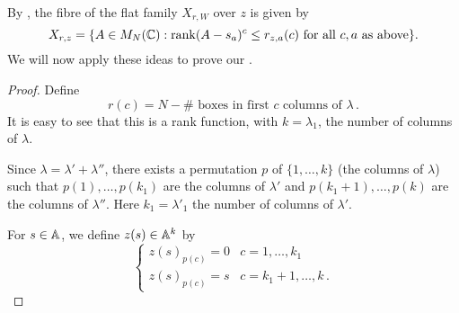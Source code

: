 \documentclass{article} %
\begin{document}
% 
By \cite[Corollary 2.2]{eisenbud1989rank}, the fibre of the flat family $ X_{r,W} $ over $ z$ is given by
\begin{equation} 
    \label{eq:ESfibre}
    X_{r,z} = \{ A \in M_N(\CC) :\rk (A-s_a)^c\le r_{z,a}(c) \text{ for all } c , a \text{ as above}\}.
\end{equation}
% 
We will now apply these ideas to prove our .
% 
\begin{proof}
% 
% 
Define 
$$
    r(c) = N - \#\text{~boxes in first $c$ columns of }\lambda\,.
$$
It is easy to see that this is a rank function, with $ k = \lambda_1$, the number of columns of $ \lambda$.

Since $\lambda = \lambda' + \lambda''$, there exists a permutation $ p $ of $ \{1, \dots, k\}$ (the columns of $ \lambda$) such that $ p(1), \dots, p(k_1) $ are the columns of $ \lambda'$ and $ p(k_1+1), \dots, p(k)$ are the columns of $ \lambda''$. Here $ k_1 = \lambda'_1$ the number of columns of $ \lambda'$.

For $ s \in \AA$, we define $ z(s) \in \AA^k$ by 
\[
\begin{cases}
    z(s)_{p(c)} = 0 &  c = 1, \dots, k_1 \\
    z(s)_{p(c)} = s &  c = k_1 + 1, \dots, k\,.
\end{cases}    
\]


\end{proof}
\end{document}
